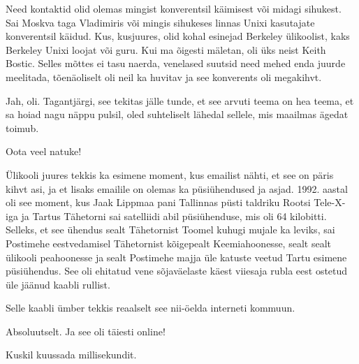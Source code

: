 
Need kontaktid olid olemas  mingist konverentsil käimisest või midagi sihukest. 
Sai Moskva taga Vladimiris või mingis sihukeses linnas Unixi kasutajate 
konverentsil käidud. Kus, kusjuures,  olid kohal esinejad Berkeley ülikoolist, 
kaks Berkeley Unixi loojat või guru. Kui ma õigesti mäletan, oli üks neist 
Keith Bostic. Selles mõttes ei tasu naerda, venelased suutsid need mehed 
enda juurde meelitada, tõenäoliselt oli neil ka huvitav ja see konverents oli 
megakihvt.


Jah, oli. Tagantjärgi, see tekitas jälle tunde, et see arvuti teema on hea 
teema, et sa hoiad nagu näppu pulsil, oled suhteliselt lähedal sellele, mis 
maailmas ägedat toimub.


Oota veel natuke! 

Ülikooli juures tekkis ka esimene moment, kus emailist nähti, et see on päris 
kihvt asi, ja et lisaks emailile on olemas ka püsiühendused ja asjad. 1992. 
aastal oli see moment, kus Jaak Lippmaa pani 
Tallinnas püsti taldriku Rootsi Tele-X-iga ja Tartus Tähetorni sai satelliidi abil püsiühenduse, mis oli 64 kilobitti. Selleks, et 
see ühendus sealt Tähetornist Toomel kuhugi mujale ka leviks, sai Postimehe 
eestvedamisel Tähetornist kõigepealt Keemiahoonesse, sealt sealt ülikooli peahoonesse ja sealt Postimehe majja 
üle katuste veetud Tartu esimene püsiühendus. See  oli ehitatud vene 
sõjaväelaste käest viiesaja rubla eest ostetud üle jäänud kaabli rullist.

Selle kaabli ümber tekkis reaalselt see nii-öelda interneti kommuun. 


Absoluutselt. Ja see oli täiesti online!


Kuskil kuussada millisekundit.


